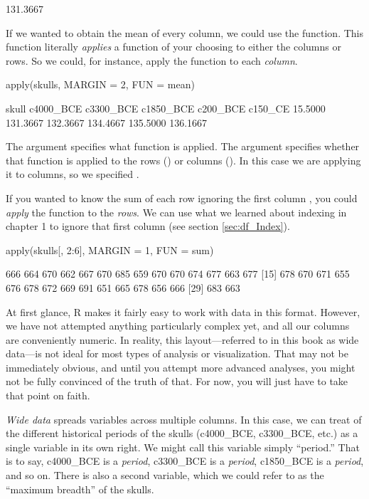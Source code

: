 \begin{outR}
[1] 131.3667
\end{outR}

If we wanted to obtain the mean of every column, we could use the  function. This function literally \textit{applies} a function of your choosing to either the columns or rows. So we could, for instance, apply the  function to each \textit{column}.

\begin{inR}
apply(skulls, MARGIN = 2, FUN = mean)
\end{inR}

\begin{outR}
    skull c4000_BCE c3300_BCE c1850_BCE  c200_BCE   c150_CE 
  15.5000  131.3667  132.3667  134.4667  135.5000  136.1667 
\end{outR}

\noindent
The argument  specifies what function is applied. The argument  specifies whether that function is applied to the rows () or columns (). In this case we are applying it to columns, so we specified .

If you wanted to know the sum of each row ignoring the first column , you could \textit{apply} the  function to the \textit{rows}. We can use what we learned about indexing in chapter 1 to ignore that first column (see section \ref{sec:df_Index}).

\begin{inR}
apply(skulls[, 2:6], MARGIN = 1, FUN = sum)
\end{inR}

\begin{outR}
 [1] 666 664 670 662 667 670 685 659 670 670 674 677 663 677
[15] 678 670 671 655 676 678 672 669 691 651 665 678 656 666
[29] 683 663
\end{outR}

At first glance, R makes it fairly easy to work with data in this format. However, we have not attempted anything particularly complex yet, and all our columns are conveniently numeric. In reality, this layout—referred to in this book as \gls{wide data}—is not ideal for most types of analysis or visualization. That may not be immediately obvious, and until you attempt more advanced analyses, you might not be fully convinced of the truth of that. For now, you will just have to take that point on faith. 

\textit{Wide data} spreads variables across multiple columns. In this case, we can treat of the different historical periods of the skulls (c4000\_BCE, c3300\_BCE, etc.) as a single variable in its own right. We might call this variable simply ``period.'' That is to say, c4000\_BCE is a \textit{period}, c3300\_BCE is a \textit{period}, c1850\_BCE is a \textit{period}, and so on. There is also a second variable, which we could refer to as the ``maximum breadth'' of the skulls.

